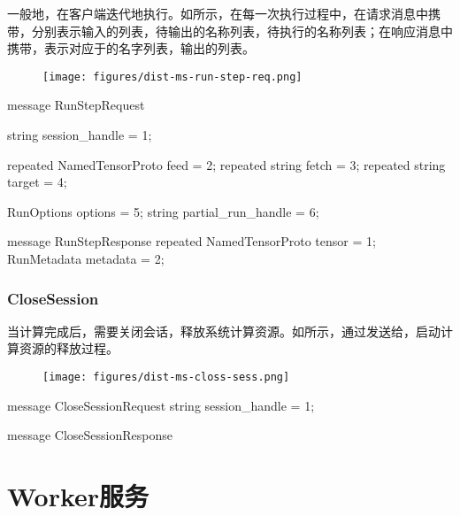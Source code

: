 \begin{content}
一般地，在客户端迭代地执行。如所示，在每一次执行过程中，在请求消息中携带，分别表示输入的列表，待输出的名称列表，待执行的名称列表；在响应消息中携带，表示对应于的名字列表，输出的列表。

\begin{figure}[H]
\centering
\texttt{[image: figures/dist-ms-run-step-req.png]}
\caption{}
 \label{fig:dist-ms-run-step-req}
\end{figure}

\begin{leftbar}
\begin{c++}
message RunStepRequest {
  string session_handle = 1;

  repeated NamedTensorProto feed = 2;
  repeated string fetch = 3;
  repeated string target = 4;

  RunOptions options = 5;
  string partial_run_handle = 6;
}

message RunStepResponse {
  repeated NamedTensorProto tensor = 1;
  RunMetadata metadata = 2;
}
\end{c++}
\end{leftbar}

\subsubsection{CloseSession}

当计算完成后，需要关闭会话，释放系统计算资源。如所示，通过发送给，启动计算资源的释放过程。

\begin{figure}[H]
\centering
\texttt{[image: figures/dist-ms-closs-sess.png]}
\caption{}
 \label{fig:dist-ms-closs-sess}
\end{figure}

\begin{leftbar}
\begin{c++}
message CloseSessionRequest {
  string session_handle = 1;
}

message CloseSessionResponse {
}
\end{c++}
\end{leftbar}

\end{content}

\section{Worker服务}

